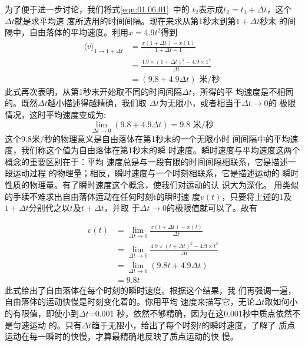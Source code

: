 为了便于进一步讨论，我们将式\ref{eqn:01.06.01}~中的
$t_2$表示成$t_2=t_1+\Delta t$，这个$\Delta t$就是求平均速
度所选用的时间间隔。现在来求从第1秒末到第$1+\Delta t$秒末
的间隔中，自由落体的平均速度。利用$x=4.9t^2$得到
\begin{equation*}
    \begin{aligned}
        \langle v\rangle_{1 \rightarrow 1+\Delta t} & =\frac{x(1+\Delta t)-x(1)}{1+\Delta t-1}                      \\
                                                    & =\frac{4.9 \times(1+\Delta t)^{2}-4.9 \times 1^{2}}{\Delta t} \\
                                                    & =(9.8+4.9 \Delta t) \text { 米/秒 }
    \end{aligned}
\end{equation*}
此式再次表明，从第1秒末开始取不同的时间间隔$\Delta t$，所得的平
均速度是不相同的。既然$\Delta t$越小描述得越精确，我们取
$\Delta t$为无限小，或者相当于$\Delta t \rightarrow 0$的
极限情况，这时平均速度变成为:
\begin{equation*}
    \lim _{\Delta t \rightarrow 0}(9.8+4.9 \Delta t)=9.8 \text { 米/秒 }
\end{equation*}
这个9.8米/秒的物理意义是自由落体在第1秒末的一个无限小时
间间隔中的平均速度，我们称这个值为自由落体在第1秒末的瞬
时速度。瞬时速度与平均速度这两个概念的重要区别在于：平均
速度总是与一段有限的时间间隔相联系，它是描述一段运动过程
的物理量；相反，瞬时速度与一个时刻相联系，它是描述运动的
瞬时性质的物理量。有了瞬时速度这个概念，使我们对运动的认
识大为深化。
用类似的手续不难求出自由落体运动在任何时刻t的瞬时速
度$v(t)$，只要将上述的1及$1+\Delta t$分别代之以$t$及$t+\Delta t$，并取
于$\Delta t \rightarrow 0$的极限值就可以了。故有

\begin{equation}\label{eqn:01.06.02}
    \begin{aligned}
        v(t) & =\lim _{\Delta t \rightarrow 0} \frac{x(t+\Delta t)-x(t)}{\Delta t}                          \\
             & =\lim _{\Delta t \rightarrow 0} \frac{4.9 \times(t+\Delta t)^{2}-4.9 \times t^{2}}{\Delta t} \\
             & =\lim _{\Delta t \rightarrow 0}(9.8 t+4.9 \Delta t)                                          \\
             & =9.8 t
    \end{aligned}
\end{equation}
此式给出了自由落体在每个时刻的瞬时速度。根据这个结果，我
们再强调一遍，自由落体的运动快慢是时刻变化着的。你用平均
速度来描写它，无论$\Delta t$取如何小的有限值，即使小到$\Delta t$=0.001
秒，依然不够精确，因为在这0.001秒中质点依然不是匀速运动
的。只有$\Delta t$趋于无限小，给出了每个时刻$t$的瞬时速度，了解了
质点运动在每一瞬时的快慢，才算最精确地反映了质点运动的快
慢。

